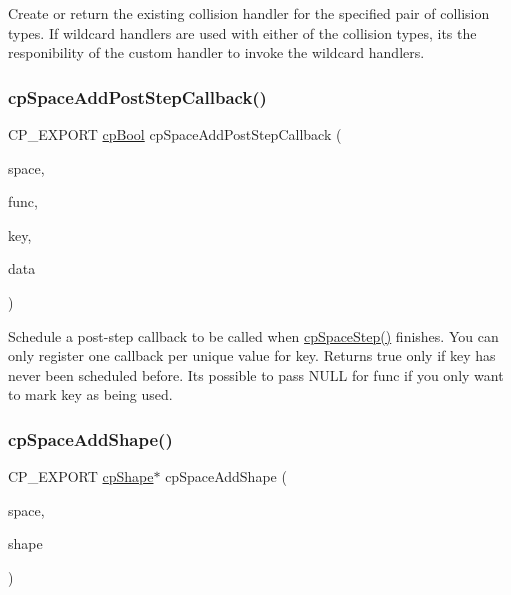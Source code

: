 Create or return the existing collision handler for the specified pair of collision types. If wildcard handlers are used with either of the collision types, it\textquotesingle{}s the responibility of the custom handler to invoke the wildcard handlers. \mbox{\label{group__cp_space_ga6fbf3c0722a5618ded1ed7371cbebcb3}} 
\subsubsection{\texorpdfstring{cp\+Space\+Add\+Post\+Step\+Callback()}{cpSpaceAddPostStepCallback()}}
{\footnotesize\ttfamily C\+P\+\_\+\+E\+X\+P\+O\+RT \mbox{\hyperlink{group__basic_types_gabc5e752c48f3449ca26ef413ecbd647e}{cp\+Bool}} cp\+Space\+Add\+Post\+Step\+Callback (\begin{DoxyParamCaption}\item[{\mbox{\hyperlink{structcp_space}{cp\+Space}} $\ast$}]{space,  }\item[{\mbox{\hyperlink{group__cp_space_ga93e9005e387fec86eeb4a225ac295a23}{cp\+Post\+Step\+Func}}}]{func,  }\item[{void $\ast$}]{key,  }\item[{void $\ast$}]{data }\end{DoxyParamCaption})}

Schedule a post-\/step callback to be called when \mbox{\hyperlink{group__cp_space_gae87c828de2fe3709393ba94046212d80}{cp\+Space\+Step()}} finishes. You can only register one callback per unique value for {\ttfamily key}. Returns true only if {\ttfamily key} has never been scheduled before. It\textquotesingle{}s possible to pass {\ttfamily N\+U\+LL} for {\ttfamily func} if you only want to mark {\ttfamily key} as being used. \mbox{\label{group__cp_space_ga8f730ea78b5c62c0aa3b05ff4ef1e5e9}} 
\subsubsection{\texorpdfstring{cp\+Space\+Add\+Shape()}{cpSpaceAddShape()}}
{\footnotesize\ttfamily C\+P\+\_\+\+E\+X\+P\+O\+RT \mbox{\hyperlink{structcp_shape}{cp\+Shape}}$\ast$ cp\+Space\+Add\+Shape (\begin{DoxyParamCaption}\item[{\mbox{\hyperlink{structcp_space}{cp\+Space}} $\ast$}]{space,  }\item[{\mbox{\hyperlink{structcp_shape}{cp\+Shape}} $\ast$}]{shape }\end{DoxyParamCaption})}

